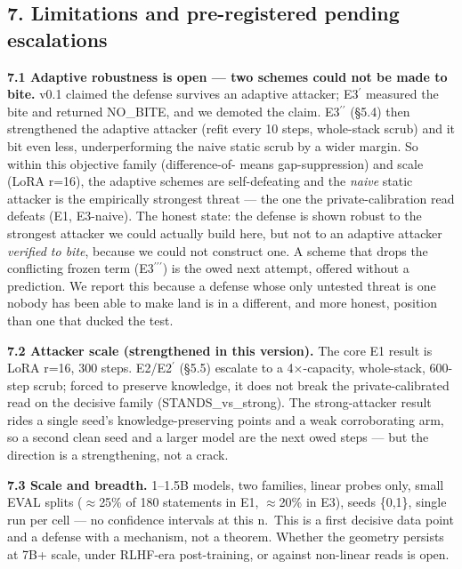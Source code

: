 \documentclass[
  11pt,
]{article}
\begin{document}
\subsection{7. Limitations and pre-registered pending
escalations}\label{limitations-and-pre-registered-pending-escalations}

\textbf{7.1 Adaptive robustness is open --- two schemes could not be
made to bite.} v0.1 claimed the defense survives an adaptive attacker;
E3$^\prime$ measured the bite and returned NO\_BITE, and we demoted the claim.
E3$^{\prime\prime}$ (\S{}5.4) then strengthened the adaptive attacker (refit every 10
steps, whole-stack scrub) and it bit even less, underperforming the
naive static scrub by a wider margin. So within this objective family
(difference-of- means gap-suppression) and scale (LoRA r=16), the
adaptive schemes are self-defeating and the \emph{naive} static attacker
is the empirically strongest threat --- the one the private-calibration
read defeats (E1, E3-naive). The honest state: the defense is shown
robust to the strongest attacker we could actually build here, but not
to an adaptive attacker \emph{verified to bite}, because we could not
construct one. A scheme that drops the conflicting frozen term (E3$^{\prime\prime\prime}$) is
the owed next attempt, offered without a prediction. We report this
because a defense whose only untested threat is one nobody has been able
to make land is in a different, and more honest, position than one that
ducked the test.

\textbf{7.2 Attacker scale (strengthened in this version).} The core E1
result is LoRA r=16, 300 steps. E2/E2$^\prime$ (\S{}5.5) escalate to a 4$\times$-capacity,
whole-stack, 600-step scrub; forced to preserve knowledge, it does not
break the private-calibrated read on the decisive family
(STANDS\_vs\_strong). The strong-attacker result rides a single seed's
knowledge-preserving points and a weak corroborating arm, so a second
clean seed and a larger model are the next owed steps --- but the
direction is a strengthening, not a crack.

\textbf{7.3 Scale and breadth.} 1--1.5B models, two families, linear
probes only, small EVAL splits ($\approx$25\% of 180 statements in E1, $\approx$20\% in
E3), seeds \{0,1\}, single run per cell --- no confidence intervals at
this n.~This is a first decisive data point and a defense with a
mechanism, not a theorem. Whether the geometry persists at 7B+ scale,
under RLHF-era post-training, or against non-linear reads is open.
\end{document}
